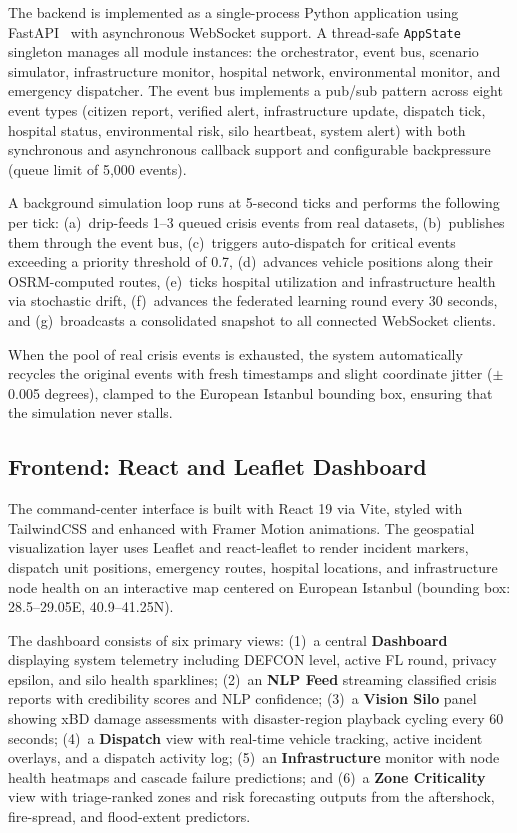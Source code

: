 \documentclass[conference]{IEEEtran}
\begin{document}
The backend is implemented as a single-process Python application using FastAPI~\cite{b9} with asynchronous WebSocket support. A thread-safe \texttt{AppState} singleton manages all module instances: the orchestrator, event bus, scenario simulator, infrastructure monitor, hospital network, environmental monitor, and emergency dispatcher. The event bus implements a pub/sub pattern across eight event types (citizen report, verified alert, infrastructure update, dispatch tick, hospital status, environmental risk, silo heartbeat, system alert) with both synchronous and asynchronous callback support and configurable backpressure (queue limit of 5{,}000 events).

A background simulation loop runs at 5-second ticks and performs the following per tick: (a)~drip-feeds 1--3 queued crisis events from real datasets, (b)~publishes them through the event bus, (c)~triggers auto-dispatch for critical events exceeding a priority threshold of 0.7, (d)~advances vehicle positions along their OSRM-computed routes, (e)~ticks hospital utilization and infrastructure health via stochastic drift, (f)~advances the federated learning round every 30 seconds, and (g)~broadcasts a consolidated snapshot to all connected WebSocket clients.

When the pool of real crisis events is exhausted, the system automatically recycles the original events with fresh timestamps and slight coordinate jitter ($\pm$0.005 degrees), clamped to the European Istanbul bounding box, ensuring that the simulation never stalls.

\subsection{Frontend: React and Leaflet Dashboard}

The command-center interface is built with React 19 via Vite, styled with TailwindCSS and enhanced with Framer Motion animations. The geospatial visualization layer uses Leaflet and react-leaflet to render incident markers, dispatch unit positions, emergency routes, hospital locations, and infrastructure node health on an interactive map centered on European Istanbul (bounding box: 28.5--29.05\textdegree E, 40.9--41.25\textdegree N).

The dashboard consists of six primary views: (1)~a central \textbf{Dashboard} displaying system telemetry including DEFCON level, active FL round, privacy epsilon, and silo health sparklines; (2)~an \textbf{NLP Feed} streaming classified crisis reports with credibility scores and NLP confidence; (3)~a \textbf{Vision Silo} panel showing xBD damage assessments with disaster-region playback cycling every 60 seconds; (4)~a \textbf{Dispatch} view with real-time vehicle tracking, active incident overlays, and a dispatch activity log; (5)~an \textbf{Infrastructure} monitor with node health heatmaps and cascade failure predictions; and (6)~a \textbf{Zone Criticality} view with triage-ranked zones and risk forecasting outputs from the aftershock, fire-spread, and flood-extent predictors.
\end{document}
